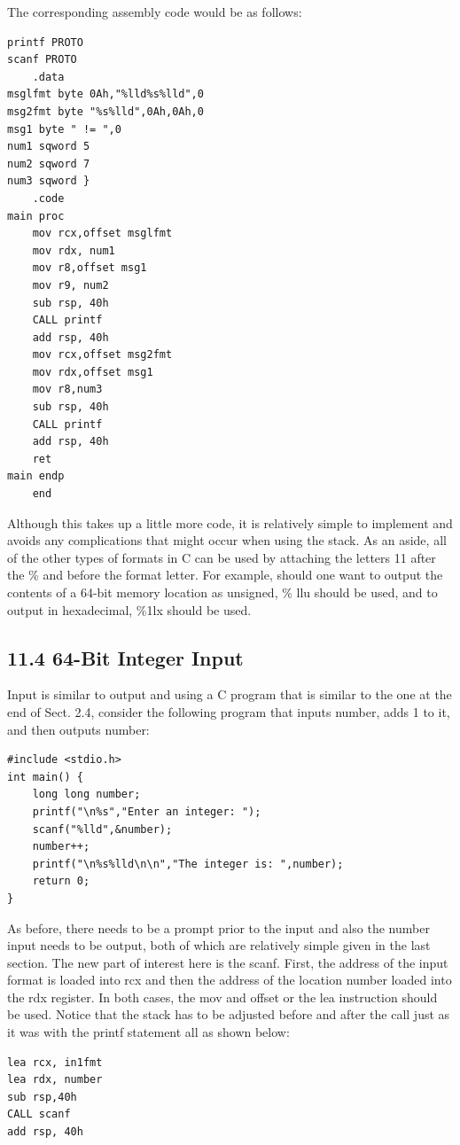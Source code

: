 \documentclass[10pt]{book}
\begin{document}
\begin{center}
\begin{center}
\begin{center}
\begin{center}
The corresponding assembly code would be as follows:

\begin{verbatim}
printf PROTO
scanf PROTO
    .data
msglfmt byte 0Ah,"%lld%s%lld",0
msg2fmt byte "%s%lld",0Ah,0Ah,0
msg1 byte " != ",0
num1 sqword 5
num2 sqword 7
num3 sqword }
    .code
main proc
    mov rcx,offset msglfmt
    mov rdx, num1
    mov r8,offset msg1
    mov r9, num2
    sub rsp, 40h
    CALL printf
    add rsp, 40h
    mov rcx,offset msg2fmt
    mov rdx,offset msg1
    mov r8,num3
    sub rsp, 40h
    CALL printf
    add rsp, 40h
    ret
main endp
    end
\end{verbatim}

Although this takes up a little more code, it is relatively simple to implement and avoids any complications that might occur when using the stack. As an aside, all of the other types of formats in C can be used by attaching the letters 11 after the \% and before the format letter. For example, should one want to output the contents of a 64-bit memory location as unsigned, \% llu should be used, and to output in hexadecimal, \%1lx should be used.

\subsection*{11.4 64-Bit Integer Input}
Input is similar to output and using a C program that is similar to the one at the end of Sect. 2.4, consider the following program that inputs number, adds 1 to it, and then outputs number:

\begin{verbatim}
#include <stdio.h>
int main() {
    long long number;
    printf("\n%s","Enter an integer: ");
    scanf("%lld",&number);
    number++;
    printf("\n%s%lld\n\n","The integer is: ",number);
    return 0;
}
\end{verbatim}

As before, there needs to be a prompt prior to the input and also the number input needs to be output, both of which are relatively simple given in the last section. The new part of interest here is the scanf. First, the address of the input format is loaded into rcx and then the address of the location number loaded into the rdx register. In both cases, the mov and offset or the lea instruction should be used. Notice that the stack has to be adjusted before and after the call just as it was with the printf statement all as shown below:


\begin{verbatim}
lea rcx, in1fmt
lea rdx, number
sub rsp,40h
CALL scanf
add rsp, 40h
\end{verbatim}


\end{center}
\end{center}
\end{center}
\end{center}
\end{document}
